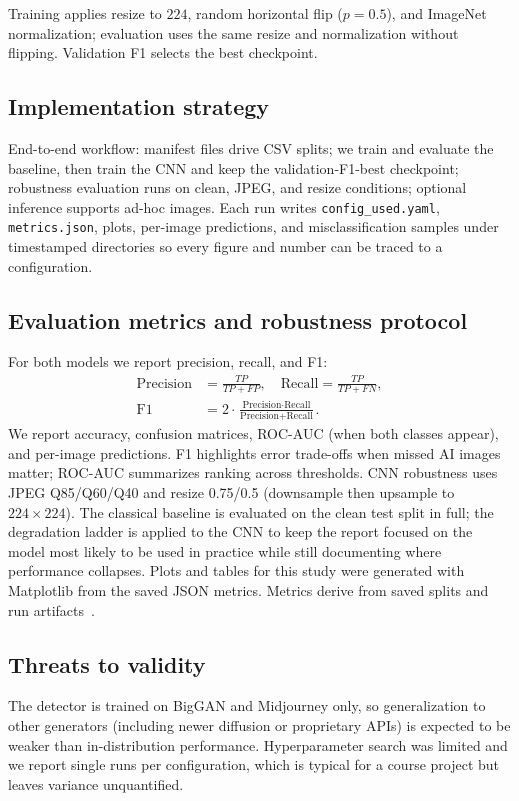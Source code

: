 \documentclass[conference]{IEEEtran}
\begin{document}
Training applies resize to $224$, random horizontal flip ($p=0.5$), and ImageNet normalization; evaluation uses the same resize and normalization without flipping. Validation F1 selects the best checkpoint.

\subsection{Implementation strategy}
End-to-end workflow: manifest files drive CSV splits; we train and evaluate the baseline, then train the CNN and keep the validation-F1-best checkpoint; robustness evaluation runs on clean, JPEG, and resize conditions; optional inference supports ad-hoc images. Each run writes \texttt{config\_used.yaml}, \texttt{metrics.json}, plots, per-image predictions, and misclassification samples under timestamped directories so every figure and number can be traced to a configuration.

\subsection{Evaluation metrics and robustness protocol}
For both models we report precision, recall, and F1:
\begin{align}
\text{Precision} &= \frac{TP}{TP+FP}, \quad \text{Recall}=\frac{TP}{TP+FN}, \nonumber\\
\text{F1} &= 2\cdot\frac{\text{Precision}\cdot\text{Recall}}{\text{Precision}+\text{Recall}}.
\end{align}
We report accuracy, confusion matrices, ROC-AUC (when both classes appear), and per-image predictions. F1 highlights error trade-offs when missed AI images matter; ROC-AUC summarizes ranking across thresholds. CNN robustness uses JPEG Q85/Q60/Q40 and resize 0.75/0.5 (downsample then upsample to $224\times224$). The classical baseline is evaluated on the clean test split in full; the degradation ladder is applied to the CNN to keep the report focused on the model most likely to be used in practice while still documenting where performance collapses. Plots and tables for this study were generated with Matplotlib from the saved JSON metrics. Metrics derive from saved splits and run artifacts~\cite{sklearnlogreg,fawcett2006roc}.

\subsection{Threats to validity}
The detector is trained on BigGAN and Midjourney only, so generalization to other generators (including newer diffusion or proprietary APIs) is expected to be weaker than in-distribution performance. Hyperparameter search was limited and we report single runs per configuration, which is typical for a course project but leaves variance unquantified.
\end{document}
